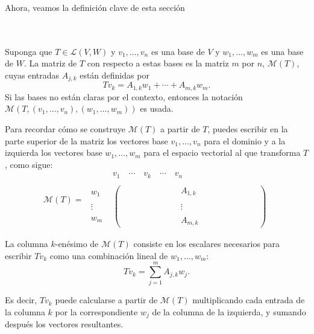 Ahora, veamos la definición clave de esta sección

\setcounter{mydef}{31}
\begin{mydef}\;\\\\
    Suponga que $T\in \mathcal{L}(V,W)$ y $v_1,\ldots,v_n$ es una base de $V$ y $w_1,\ldots,w_m$ es una base de $W$. La matriz de $T$ con respecto a estas bases es la matriz $m$ por $n$, $\mathcal{M}(T)$, cuyas entradas $A_{j,k}$ están definidas por
    $$Tv_k = A_{1,k}w_1+\cdots+A_{m,k}w_m.$$
    Si las bases no están claras por el contexto, entonces la notación $\mathcal{M}\left(T,(v_1,\ldots,v_n),(w_1,\ldots,w_m)\right)$  es usada.
\end{mydef}

Para recordar cómo se construye $\mathcal{M}(T)$ a partir de $T$, puedes escribir en la parte superior de la matriz los vectores base $v_1,\ldots,v_n$ para el dominio y a la izquierda los vectores base $w_1,\ldots,w_m$ para el espacio vectorial al que transforma $T$, como sigue:
$$
\mathcal{M}(T)=
    \begin{array}{cc}
	&v_1 \quad \cdots\quad v_k \quad \cdots \quad v_n\\\\
	\begin{array}{c}
	    w_1\\\\
	    \vdots\\\\
	    w_m
	\end{array}
	&
	\begin{pmatrix}
	    \qquad\qquad\qquad&A_{1,k}&\qquad\qquad\qquad\\\\
		  &\vdots&\\\\
		  &A_{m,k}&
	\end{pmatrix}
    \end{array}
$$

La columna $k$-enésimo de $\mathcal{M}(T)$ consiste en los escalares necesarios para escribir $Tv_k$ como una combinación lineal de $w_1,\ldots,w_m$:
$$Tv_k=\sum_{j=1}^m A_{j,k}w_j.$$

Es decir, $Tv_{k}$ puede calcularse a partir de $\mathcal{M}(T)$ multiplicando cada entrada de la columna $k$ por la correspondiente $w_j$ de la columna de la izquierda, y sumando después los vectores resultantes.\\\\


